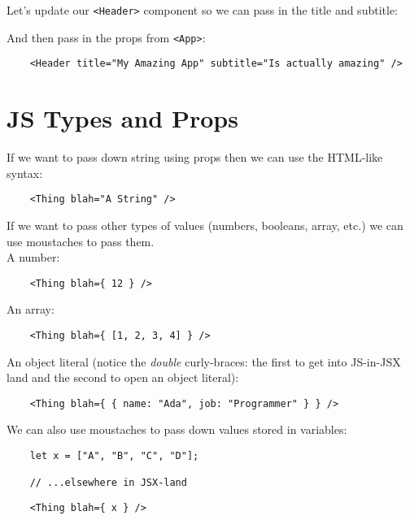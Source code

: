 Let's update our \texttt{<Header>} component so we can pass in the title and subtitle:


And then pass in the props from \texttt{<App>}:

\begin{verbatim}
    <Header title="My Amazing App" subtitle="Is actually amazing" />
\end{verbatim}



\section{JS Types and Props}

If we want to pass down string using props then we can use the HTML-like syntax:

\begin{verbatim}
    <Thing blah="A String" />
\end{verbatim}

If we want to pass other types of values (numbers, booleans, array, etc.) we can use moustaches to pass them.
\\

A number:

\begin{verbatim}
    <Thing blah={ 12 } />
\end{verbatim}

An array:

\begin{verbatim}
    <Thing blah={ [1, 2, 3, 4] } />
\end{verbatim}

An object literal (notice the \textit{double} curly-braces: the first to get into JS-in-JSX land and the second to open an object literal):

\begin{verbatim}
    <Thing blah={ { name: "Ada", job: "Programmer" } } />
\end{verbatim}

We can also use moustaches to pass down values stored in variables:

\begin{verbatim}
    let x = ["A", "B", "C", "D"];

    // ...elsewhere in JSX-land
\end{verbatim}
\begin{verbatim}
    <Thing blah={ x } />
\end{verbatim}


